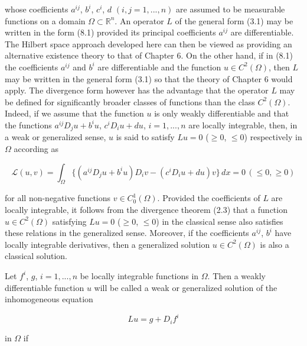 whose coefficients $a^{ij}$, $b^i$, $c^i$, $d$ $(i,j = 1, . . . , n)$ are assumed to be measurable
functions on a domain $\Omega \subset \mathbb{R}^n$. An operator $L$ of the general form (3.1) may be
written in the form (8.1) provided its principal coefficients $a^{ij}$ are differentiable.
The Hilbert space approach developed here can then be viewed as providing an
alternative existence theory to that of Chapter 6. On the other hand, if in (8.1) the
coefficients $a^{ij}$ and $b^i$ are differentiable and the function $u \in C^2(\Omega)$, then $L$ may be
written in the general form (3.1) so that the theory of Chapter 6 would apply. The
divergence form however has the advantage that the operator $L$ may be defined for
significantly broader classes of functions than the class $C^2(\Omega)$. Indeed, if we assume
that the function $u$ is only weakly differentiable and that the functions $a^{ij}D_j u + b^i u$,
$c^i D_i u + du$, $i = 1, . . . , n$ are locally integrable, then, in a weak or generalized sense,
$u$ is said to satisfy $Lu = 0$ ($\geq 0$, $\leq 0$) respectively in $\Omega$ according as

\begin{equation}
\mathcal{L}(u, v) = \int_\Omega \{(a^{ij}D_j u + b^i u)D_i v - (c^i D_i u + du)v\}\,dx = 0 \, (\leq 0, \geq 0)
\tag{8.2}
\end{equation}

for all non-negative functions $v \in C_0^1(\Omega)$. Provided the coefficients of $L$ are locally
integrable, it follows from the divergence theorem (2.3) that a function $u \in C^2(\Omega)$
satisfying $Lu = 0$ ($\geq 0$, $\leq 0$) in the classical sense also satisfies these relations in the
generalized sense. Moreover, if the coefficients $a^{ij}$, $b^i$ have locally integrable
derivatives, then a generalized solution $u \in C^2(\Omega)$ is also a classical solution.

Let $f^i$, $g$, $i = 1, . . . , n$ be locally integrable functions in $\Omega$. Then a weakly
differentiable function $u$ will be called a weak or generalized solution of the
inhomogeneous equation

\begin{equation}
Lu = g + D_i f^i
\tag{8.3}
\end{equation}

in $\Omega$ if
